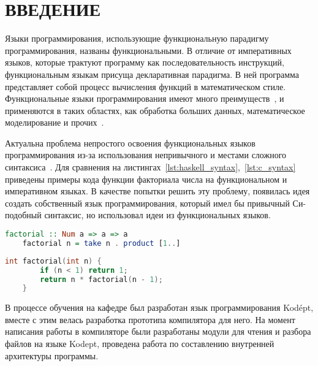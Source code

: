 \chapter*{ВВЕДЕНИЕ}\label{ch:introduction}


Языки программирования, использующие функциональную парадигму программирования, названы функциональными.
В отличие от императивных языков, которые трактуют программу как последовательность инструкций, функциональным языкам присуща декларативная парадигма.
В ней программа представляет собой процесс вычисления функций в математическом стиле.
Функциональные языки программирования имеют много преимуществ~\cite{WhyFunctional},
и применяются в таких областях, как обработка больших данных, математическое моделирование и прочих~\cite{ScalaBigData}.

Актуальна проблема непростого освоения функциональных языков программирования из-за использования непривычного и местами сложного синтаксиса~\cite{HaskellBook}.
Для сравнения на листингах~\ref{lst:haskell_syntax},~\ref{lst:c_syntax} приведены примеры кода функции факториала числа на функциональном и императивном языках.
В качестве попытки решить эту проблему, появилась идея создать собственный язык программирования, который имел бы привычный Си-подобный синтаксис, но использовал идеи из функциональных языков.

\begin{lstlisting}[label={lst:haskell_syntax}, language=Haskell, caption={Пример функции факториала числа в языке Haskell}]
    factorial :: Num a => a => a
    factorial n = take n . product [1..]
\end{lstlisting}

\begin{lstlisting}[label={lst:c_syntax}, caption={Пример функции факториала числа в языке C}, language=C]
    int factorial(int n) {
        if (n < 1) return 1;
        return n * factorial(n - 1);
    }
\end{lstlisting}

В процессе обучения на кафедре был разработан язык программирования Kodépt, вместе с этим велась разработка прототипа компилятора для него.
На момент написания работы в компиляторе были разработаны модули для чтения и разбора файлов на языке Kodept, проведена работа по составлению внутренней архитектуры программы.

